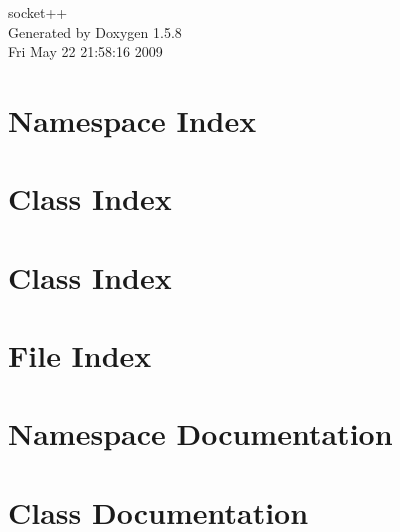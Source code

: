 \documentclass[a4paper]{book}
\begin{document}
\begin{titlepage}
\vspace*{7cm}
\begin{center}
{\Large socket++ }\\
\vspace*{1cm}
{\large Generated by Doxygen 1.5.8}\\
\vspace*{0.5cm}
{\small Fri May 22 21:58:16 2009}\\
\end{center}
\end{titlepage}
\clearemptydoublepage
{}
\tableofcontents
\clearemptydoublepage
{}
\chapter{Namespace Index}

\chapter{Class Index}

\chapter{Class Index}

\chapter{File Index}

\chapter{Namespace Documentation}


\chapter{Class Documentation}
























\end{document}
